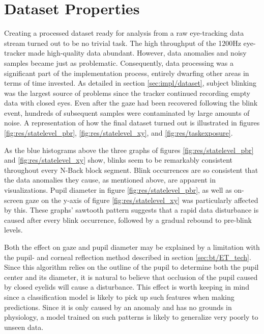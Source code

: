 \section{Dataset Properties} \label{sec:disc/dataset}

Creating a processed dataset ready for analysis from a raw eye-tracking data stream turned out to be no trivial task. The high throughput of the 1200Hz eye-tracker made high-quality data abundant. However, data anomalies and noisy samples became just as problematic. Consequently, data processing was a significant part of the implementation process, entirely dwarfing other areas in terms of time invested. As detailed in section \ref{sec:impl/dataset}, subject blinking was the largest source of problems since the tracker continued recording empty data with closed eyes. Even after the gaze had been recovered following the blink event, hundreds of subsequent samples were contaminated by large amounts of noise. A representation of how the final dataset turned out is illustrated in figures \ref{fig:res/statelevel_pbr}, \ref{fig:res/statelevel_xy}, and \ref{fig:res/taskexposure}.

As the blue histograms above the three graphs of figures \ref{fig:res/statelevel_pbr} and \ref{fig:res/statelevel_xy} show, blinks seem to be remarkably consistent throughout every N-Back block segment. Blink occurrences are so consistent that the data anomalies they cause, as mentioned above, are apparent in visualizations. Pupil diameter in figure \ref{fig:res/statelevel_pbr}, as well as on-screen gaze on the y-axis of figure \ref{fig:res/statelevel_xy} was particularly affected by this. These graphs' sawtooth pattern suggests that a rapid data disturbance is caused after every blink occurrence, followed by a gradual rebound to pre-blink levels. 

Both the effect on gaze and pupil diameter may be explained by a limitation with the pupil- and corneal reflection method described in section \ref{sec:bt/ET_tech}. Since this algorithm relies on the outline of the pupil to determine both the pupil center and its diameter, it is natural to believe that occlusion of the pupil caused by closed eyelids will cause a disturbance. This effect is worth keeping in mind since a classification model is likely to pick up such features when making predictions. Since it is only caused by an anomaly and has no grounds in physiology, a model trained on such patterns is likely to generalize very poorly to unseen data.

